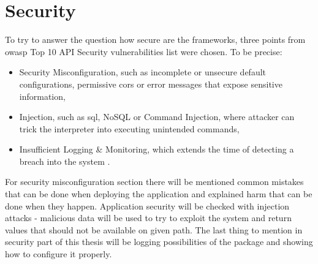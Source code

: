 \section{Security}
To try to answer the question how secure are the frameworks, three points from \acrshort{owasp} Top 10 API Security vulnerabilities list were chosen. To be precise:
\begin{itemize}
  \item Security Misconfiguration, such as incomplete or unsecure default configurations, permissive \acrshort{cors} or error messages that expose sensitive information,
  \item Injection, such as \acrshort{sql}, NoSQL or Command Injection, where attacker can trick the interpreter into executing unintended commands,
  \item Insufficient Logging \& Monitoring, which extends the time of detecting a breach into the system \cite{owaspTop10}.
\end{itemize}
For security misconfiguration section there will be mentioned common mistakes that can be done when deploying the application and explained harm that can be done when they happen.
Application security will be checked with injection attacks - malicious data will be used to try to exploit the system and return values that should not be available on given path.
The last thing to mention in security part of this thesis will be logging possibilities of the package and showing how to configure it properly.
